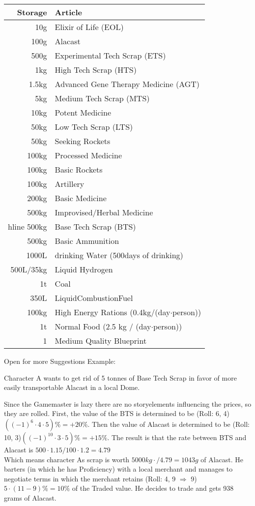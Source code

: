 \begin{tabular}{|r|l|}
    \hline
    Storage & Article\\\hline
    10g & Elixir of Life (EOL)\\\hline
    100g & Alacast\\\hline
    500g & Experimental Tech Scrap (ETS)\\\hline
    1kg & High Tech Scrap (HTS)\\\hline
    1.5kg & Advanced Gene Therapy Medicine (AGT)\\\hline
    5kg & Medium Tech Scrap (MTS)\\\hline
    10kg & Potent Medicine\\\hline
    50kg & Low Tech Scrap (LTS)\\\hline
    50kg & Seeking Rockets\\\hline
    100kg & Processed Medicine\\\hline
    100kg & Basic Rockets\\\hline
    100kg & Artillery\\\hline
    200kg & Basic Medicine\\\hline
    500kg & Improvised/Herbal Medicine\\hline
    500kg & Base Tech Scrap (BTS)\\\hline
    500kg & Basic Ammunition\\\hline
    1000L & drinking Water (500days of drinking)\\\hline
    500L/35kg & Liquid Hydrogen\\\hline
    1t & Coal\\\hline
    350L & LiquidCombustionFuel\\\hline
    100kg & High Energy Rations (0.4kg/(day\(\cdot\)person))\\\hline
    1t & Normal Food (2.5 kg / (day\(\cdot\)person))\\\hline
    1 & Medium Quality Blueprint\\\hline
\end{tabular}\par
Open for more Suggestions\vspace{1.5cm}
Example:\par
Character A wants to get rid of 5 tonnes of Base Tech Scrap in favor of more easily transportable Alacast in a local
Dome.\par
Since the Gamemaster is lazy there are no storyelements influencing the prices, so they are rolled.
First, the value of
the BTS is determined to be (Roll: 6, 4) \(((-1)^{6}\cdot4\cdot5) \% = +20\%\).
Then the value of Alacast is determined
to be (Roll: 10, 3)\(((-1)^{10}\cdot3\cdot5) \% = +15\%\).
The result is that the rate between BTS and Alacast is
\( 500\cdot1.15/100\cdot1.2 = 4.79\) \\ Which means character As scrap is worth
\(5000 kg\cdot / 4.79 = 1043 g \) of Alacast.
He barters (in which he has Proficiency) with a local merchant and manages to
negotiate terms in which the merchant retains (Roll: 4, 9 \(\Rightarrow\) 9) \(5\cdot(11-9)\% = 10\%\) of the Traded
value.
He decides to trade and gets 938 grams of Alacast.\vspace{1.5cm}
\pagebreak

